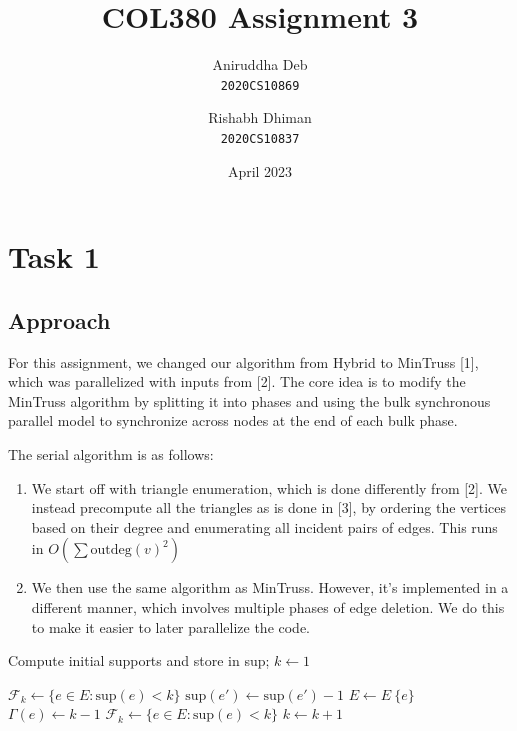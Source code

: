 \documentclass[12pt]{article}
\title{\textbf{COL380 Assignment 3}}
\author{%
    \begin{tabular}{c}Aniruddha Deb \\ \texttt{2020CS10869}\end{tabular} \and%
    \begin{tabular}{c}Rishabh Dhiman \\ \texttt{2020CS10837}\end{tabular} %
}
\date{April 2023}
\begin{document}
\maketitle

\section*{Task 1}

\subsection*{Approach}

For this assignment, we changed our algorithm from Hybrid to MinTruss [1], which
was parallelized with inputs from [2]. The core idea is to modify the MinTruss
algorithm by splitting it into phases and using the bulk synchronous parallel
model to synchronize across nodes at the end of each bulk phase. 

The serial algorithm is as follows:
\begin{enumerate}
    \item We start off with triangle enumeration, which is done differently 
        from [2]. We instead precompute all the triangles as is done in [3],
        by ordering the vertices based on their degree and enumerating all
        incident pairs of edges. This runs in $O\left(\sum
        \text{outdeg}(v)^2\right)$
    \item We then use the same algorithm as MinTruss. However, it's implemented
        in a different manner, which involves multiple phases of edge deletion.
        We do this to make it easier to later parallelize the code.
\end{enumerate}

\begin{algorithmic}[1]
    \State Compute initial supports and store in sup;
    \State $k \gets 1$

        \State $\mathcal{F}_k \gets \{ e \in E: \text{sup}(e) < k\}$
                    \State $\text{sup}(e') \gets \text{sup}(e') - 1$
                \EndFor
                \State $E \gets E \ \{e\}$
                \State $\Gamma(e) \gets k - 1$
            \EndFor
            \State $\mathcal{F}_k \gets \{ e \in E: \text{sup}(e) < k\}$
        \EndWhile
        \State $k \gets k+1$
    \EndWhile
\end{algorithmic}
\end{document}
